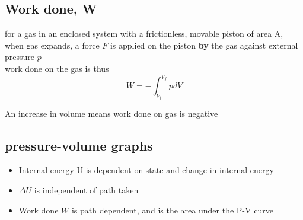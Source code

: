 \documentclass[a4paper, 10pt]{article}
\begin{document}
\subsection{Work done, W}
for a gas in an enclosed system with a frictionless, movable piston of area A, when gas expands, a force $F$ is applied on the piston \textbf{by} the gas against external pressure $p$  \\

work done on the gas is thus 
\[
   W = - \int_{V_i} ^{V_f} pdV
\]

An increase in volume means work done on gas is negative

\subsection{pressure-volume graphs}
\begin{itemize}
   \item Internal energy U is dependent on state and change in internal energy
   \item $\Delta U$ is independent of path taken
   \item Work done $W$ is path dependent, and is the area under the P-V curve
\end{itemize}	
\end{document}
